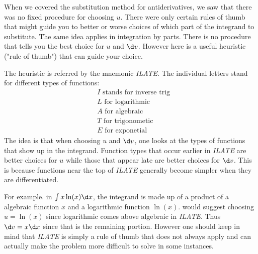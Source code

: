 \documentclass{ximera}
\begin{document}
When we covered the substitution method for antiderivatives, we saw that there was no fixed procedure for choosing $u$. There were only certain rules of thumb that might guide you to better or worse choices of which part of the integrand to substitute. The same idea applies in integration by parts. There is no procedure that tells you the best choice for $u$ and $\d v$. However here is a useful heuristic ("rule of thumb") that can guide your choice. 

The heuristic is referred by the mnemonic \textit{ILATE}.  The individual letters stand for different types of functions: 
\begin{align}
&I \text{  stands for inverse trig} \\ 
&L \text{  for logarithmic} \\
&A \text{  for algebraic} \\
&T \text{  for trigonometic} \\
&E \text{  for exponetial}
\end{align}
The idea is that when choosing $u$ and $\d v$, one looks at the types of functions that show up in the integrand. Function types that occur earlier in \textit{ILATE} are better choices for $u$ while those that appear late are better choices for $\d v$. This is because functions near the top of  \textit{ILATE} generally become simpler when they are differentiated. 

For example. in $\int x \ln(x) \d x$, the integrand is made up of a product of a algebraic function $x$ and a logarithmic function $\ln(x)$.    would suggest choosing $u=\ln(x)$ since logarithmic comes above algebraic in \textit{ILATE}. Thus $\d v=x \d x$ since that is the remaining portion. However one should keep in mind that \textit{ILATE} is simply a rule of thumb that does not always apply and can actually make the problem more difficult to solve in some instances. 
\end{document}
